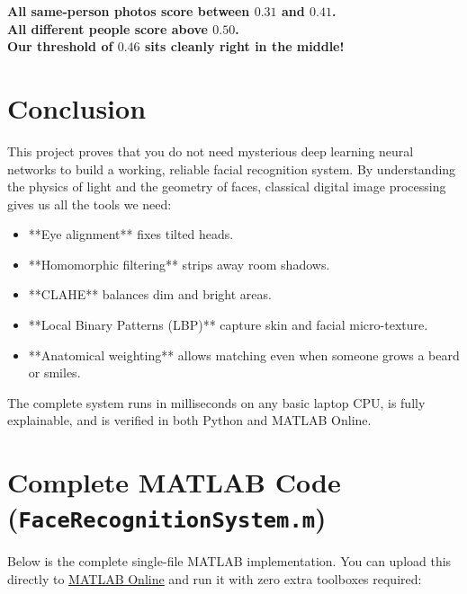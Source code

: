 \documentclass[11pt,a4paper]{article}
\begin{document}
\begin{center}
    \textbf{All same-person photos score between $0.31$ and $0.41$.}\\
    \textbf{All different people score above $0.50$.}\\
    \textbf{Our threshold of $0.46$ sits cleanly right in the middle!}
\end{center}

\section{Conclusion}

This project proves that you do not need mysterious deep learning neural networks to build a working, reliable facial recognition system. By understanding the physics of light and the geometry of faces, classical digital image processing gives us all the tools we need:
\begin{itemize}[leftmargin=1.5em]
    \item **Eye alignment** fixes tilted heads.
    \item **Homomorphic filtering** strips away room shadows.
    \item **CLAHE** balances dim and bright areas.
    \item **Local Binary Patterns (LBP)** capture skin and facial micro-texture.
    \item **Anatomical weighting** allows matching even when someone grows a beard or smiles.
\end{itemize}
The complete system runs in milliseconds on any basic laptop CPU, is fully explainable, and is verified in both Python and MATLAB Online.

\newpage
\appendix
\section{Complete MATLAB Code (\texttt{FaceRecognitionSystem.m})}

Below is the complete single-file MATLAB implementation. You can upload this directly to \href{https://matlab.mathworks.com}{MATLAB Online} and run it with zero extra toolboxes required:
\end{document}
